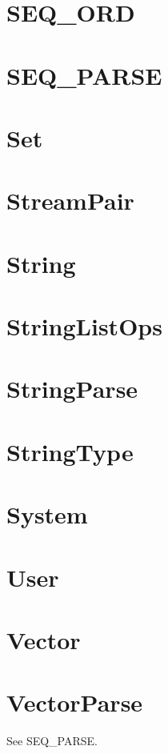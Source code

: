 \newpage
\section{SEQ\_ORD}


\newpage
\section{SEQ\_PARSE}


\newpage
\section{Set}


\newpage
\section{StreamPair}


\newpage
\section{String}


\newpage
\section{StringListOps}


\newpage
\section{StringParse}


\newpage
\section{StringType}


\newpage
\section{System}


\newpage
\section{User}


\newpage
\section{Vector}


\newpage
\section{VectorParse}
See SEQ\_PARSE.





